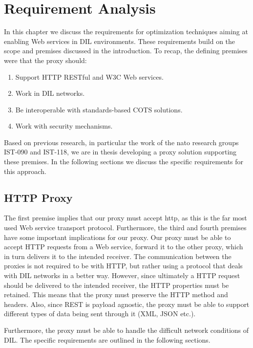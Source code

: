 \chapter{Requirement Analysis}
\label{chapter:requirements}

In this chapter we discuss the requirements for optimization techniques aiming
at enabling Web services in DIL environments. These requirements build on the
scope and premises discussed in the introduction. To recap, the defining
premises were that the proxy should:

\begin{enumerate}
    \item Support HTTP RESTful and W3C Web services.
    \item Work in DIL networks.
    \item Be interoperable with standards-based COTS solutions.
    \item Work with security mechanisms.
\end{enumerate}

Based on previous research, in particular the work of the \gls{nato} research
groups IST-090 and IST-118, we are in thesis developing a proxy solution
supporting these premises. In the following sections we discuss the specific
requirements for this approach.

\section{HTTP Proxy}

The first premise implies that our proxy must accept \gls{http}, as this is the
far most used Web service transport protocol. Furthermore, the third and fourth
premises have some important implications for our proxy. Our proxy must be able
to accept HTTP requests from a Web service, forward it to the other proxy, which
in turn delivers it to the intended receiver. The communication between the
proxies is not required to be with HTTP, but rather using a protocol that deals
with DIL networks in a better way. However, since ultimately a HTTP request
should be delivered to the intended receiver, the HTTP properties must be
retained. This means that the proxy must preserve the HTTP method and headers.
Also, since REST is payload agnostic, the proxy must be able to support
different types of data being sent through it (XML, JSON etc.).

Furthermore, the proxy must be able to handle the difficult network conditions
of DIL. The specific requirements are outlined in the following sections.

